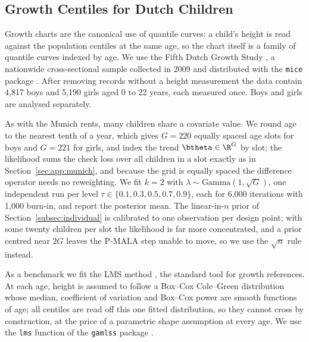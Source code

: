 \subsection{Growth Centiles for Dutch Children}
\label{sec:app:growth}

Growth charts are the canonical use of quantile curves: a child's height is read against the population centiles at the same age, so the chart itself is a family of quantile curves indexed by age. We use the Fifth Dutch Growth Study \citep{schonbeck2013tallest}, a nationwide cross-sectional sample collected in 2009 and distributed with the \texttt{mice} package \citep{vanbuuren2011mice}. After removing records without a height measurement the data contain 4{,}817 boys and 5{,}190 girls aged 0 to 22 years, each measured once. Boys and girls are analysed separately.

As with the Munich rents, many children share a covariate value. We round age to the nearest tenth of a year, which gives $G = 220$ equally spaced age slots for boys and $G = 221$ for girls, and index the trend $\btheta \in \R^{G}$ by slot; the likelihood sums the check loss over all children in a slot exactly as in Section~\ref{sec:app:munich}, and because the grid is equally spaced the difference operator needs no reweighting. We fit $k = 2$ with $\lambda \sim \mathrm{Gamma}(1, \sqrt{G})$, one independent run per level $\tau \in \{0.1, 0.3, 0.5, 0.7, 0.9\}$, each for 6{,}000 iterations with 1{,}000 burn-in, and report the posterior mean. The linear-in-$n$ prior of Section~\ref{subsec:individual} is calibrated to one observation per design point; with some twenty children per slot the likelihood is far more concentrated, and a prior centred near $2G$ leaves the P-MALA step unable to move, so we use the $\sqrt{n}$ rule instead.

As a benchmark we fit the LMS method \citep{cole1992smoothing}, the standard tool for growth references. At each age, height is assumed to follow a Box--Cox Cole--Green distribution whose median, coefficient of variation and Box--Cox power are smooth functions of age; all centiles are read off this one fitted distribution, so they cannot cross by construction, at the price of a parametric shape assumption at every age. We use the \texttt{lms} function of the \texttt{gamlss} package \citep{rigby2005generalized}.

